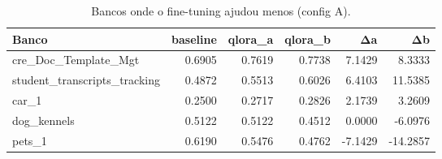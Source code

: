 \begin{table}[ht]
\centering
\caption{Bancos onde o fine-tuning ajudou menos (config A).}
\label{tab:per_db_bottom}
\begin{tabular}{lrrrrr}
\toprule
Banco & baseline & qlora_a & qlora_b & Δa & Δb \\
\midrule
cre\_Doc\_Template\_Mgt & 0.6905 & 0.7619 & 0.7738 & 7.1429 & 8.3333 \\
student\_transcripts\_tracking & 0.4872 & 0.5513 & 0.6026 & 6.4103 & 11.5385 \\
car\_1 & 0.2500 & 0.2717 & 0.2826 & 2.1739 & 3.2609 \\
dog\_kennels & 0.5122 & 0.5122 & 0.4512 & 0.0000 & -6.0976 \\
pets\_1 & 0.6190 & 0.5476 & 0.4762 & -7.1429 & -14.2857 \\
\bottomrule
\end{tabular}
\end{table}